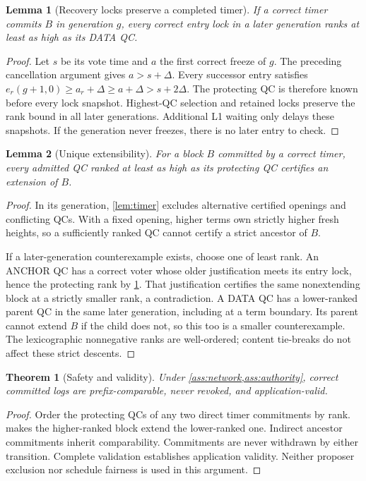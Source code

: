 \documentclass[11pt,a4paper]{article}
\newtheorem{lemma}[lemma]{Lemma}
\newtheorem{theorem}[theorem]{Theorem}
\begin{document}
\begin{lemma}[Recovery locks preserve a completed timer]
\label{lem:lock}
If a correct timer commits $B$ in generation $g$, every correct entry
lock in a later generation ranks at least as high as its DATA QC.
\end{lemma}
\begin{proof}
Let $s$ be its vote time and $a$ the first correct freeze of $g$.
The preceding cancellation argument gives $a>s+\Delta$. Every successor
entry satisfies
$e_r(g+1,0)\ge a_r+\Delta\ge a+\Delta>s+2\Delta$.
The protecting QC is therefore known before every lock snapshot.
Highest-QC selection and retained locks preserve the rank bound in all
later generations. Additional L1 waiting only delays these snapshots.
If the generation never freezes, there is no later entry to check.
\end{proof}

\begin{lemma}[Unique extensibility]
\label{lem:extension}
For a block $B$ committed by a correct timer, every admitted QC ranked
at least as high as its protecting QC certifies an extension of $B$.
\end{lemma}
\begin{proof}
In its generation, \cref{lem:timer} excludes alternative certified
openings and conflicting QCs. With a fixed opening, higher terms own
strictly higher fresh heights, so a sufficiently ranked QC cannot certify
a strict ancestor of $B$.

If a later-generation counterexample exists, choose one of least rank.
An ANCHOR QC has a correct voter whose older justification meets its
entry lock, hence the protecting rank by \cref{lem:lock}. That justification
certifies the same nonextending block at a strictly smaller rank, a
contradiction. A DATA QC has a lower-ranked parent QC in the same later
generation, including at a term boundary. Its parent cannot extend $B$
if the child does not, so this too is a smaller counterexample. The
lexicographic nonnegative ranks are well-ordered; content tie-breaks do
not affect these strict descents.
\end{proof}

\begin{theorem}[Safety and validity]
\label{thm:safety}
Under \cref{ass:network,ass:authority}, correct committed logs are
prefix-comparable, never revoked, and application-valid.
\end{theorem}
\begin{proof}
Order the protecting QCs of any two direct timer commitments by rank.
 makes the higher-ranked block extend the lower-ranked
one. Indirect ancestor commitments inherit comparability. Commitments
are never withdrawn by either transition. Complete validation establishes
application validity. Neither proposer exclusion nor schedule fairness
is used in this argument.
\end{proof}
\end{document}
